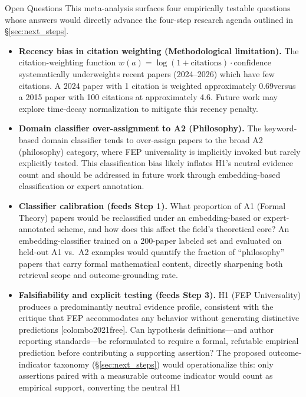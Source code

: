 \documentclass[
  ignorenonframetext,
]{beamer}
\providecommand{\citep}[1]{[#1]}
\begin{document}
\begin{frame}[allowframebreaks]{Open Questions}
\protect{}\label{open-questions}
This meta-analysis surfaces four empirically testable questions whose
answers would directly advance the four-step research agenda outlined in
\S\ref{sec:next_steps}.

\begin{itemize}
\item
  \textbf{Recency bias in citation weighting (Methodological
  limitation).} The citation-weighting function
  \(w(a) = \log(1+\text{citations}) \cdot \text{confidence}\)
  systematically underweights recent papers (2024--2026) which have few
  citations. A 2024 paper with 1 citation is weighted approximately
  0.69\times versus a 2015 paper with 100 citations at approximately
  4.6\times. Future work may explore time-decay normalization to
  mitigate this recency penalty.
\item
  \textbf{Domain classifier over-assignment to A2 (Philosophy).} The
  keyword-based domain classifier tends to over-assign papers to the
  broad A2 (philosophy) category, where FEP universality is implicitly
  invoked but rarely explicitly tested. This classification bias likely
  inflates H1's neutral evidence count and should be addressed in future
  work through embedding-based classification or expert annotation.
\item
  \textbf{Classifier calibration (feeds Step 1).} What proportion of A1
  (Formal Theory) papers would be reclassified under an embedding-based
  or expert-annotated scheme, and how does this affect the field's
  theoretical core? An embedding-classifier trained on a 200-paper
  labeled set and evaluated on held-out A1 vs.~A2 examples would
  quantify the fraction of ``philosophy'' papers that carry formal
  mathematical content, directly sharpening both retrieval scope and
  outcome-grounding rate.
\item
  \textbf{Falsifiability and explicit testing (feeds Step 3).} H1 (FEP
  Universality) produces a predominantly neutral evidence profile,
  consistent with the critique that FEP accommodates any behavior
  without generating distinctive predictions \citep{colombo2021free}.
  Can hypothesis definitions---and author reporting standards---be
  reformulated to require a formal, refutable empirical prediction
  before contributing a supporting assertion? The proposed
  outcome-indicator taxonomy (§\ref{sec:next_steps}) would
  operationalize this: only assertions paired with a measurable outcome
  indicator would count as empirical support, converting the neutral H1

\end{itemize}
\end{frame}
\end{document}
